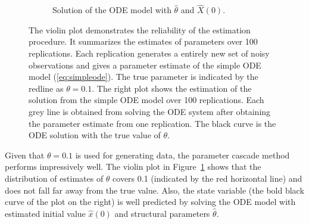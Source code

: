 \begin{figure}[H]
\begin{subfigure}[t]{0.5\textwidth}
        \caption{Solution of the ODE model with $\hat{\theta}$ and $\hat{X}(0)$.}
    \end{subfigure}
    \caption{\label{fig:simpleresult} The violin plot demonstrates the reliability of the estimation procedure. It summarizes the estimates of parameters over 100 replications. Each replication generates a entirely new set of noisy observations and gives a parameter estimate of the simple ODE model (\ref{eq:simpleode}). The true parameter is indicated by the redline as $\theta = 0.1$. The right plot shows the estimation of the solution from the simple ODE model over 100 replications. Each grey line is obtained from solving the ODE system after obtaining the parameter estimate from one replication. The black curve is the ODE solution with the true value of $\theta$. }
\end{figure}
Given that $\theta = 0.1$ is used for generating data, the parameter cascade method performs impressively well. The violin plot in Figure~\ref{fig:simpleresult} shows that the distribution of estimates of $\theta$ covers 0.1 (indicated by the red horizontal line) and does not fall far away from the true value. Also, the state variable  (the bold black curve of the plot on the right) is well predicted by solving the ODE model with estimated initial value $\hat{x}(0)$ and structural parameters $\hat{\theta}$.


